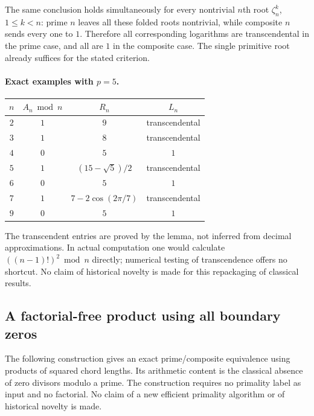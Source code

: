 \documentclass[11pt,a4paper]{article}
\theoremstyle{definition}
\theoremstyle{remark}
\numberwithin{equation}{section}
\begin{document}
The same conclusion holds simultaneously for every nontrivial $n$th
root $\zeta_n^k$, $1\le k<n$: prime $n$ leaves all these folded roots
nontrivial, while composite $n$ sends every one to $1$. Therefore all
corresponding logarithms are transcendental in the prime case, and all
are $1$ in the composite case. The single primitive root already
suffices for the stated criterion.

\paragraph{Exact examples with $p=5$.}
\begin{center}
\begin{tabular}{c c c c}
$n$ & $A_n\bmod n$ & $R_n$ & $L_n$\\\hline
$2$ & $1$ & $9$ & transcendental\\
$3$ & $1$ & $8$ & transcendental\\
$4$ & $0$ & $5$ & $1$\\
$5$ & $1$ & $(15-\sqrt5)/2$ & transcendental\\
$6$ & $0$ & $5$ & $1$\\
$7$ & $1$ & $7-2\cos(2\pi/7)$ & transcendental\\
$9$ & $0$ & $5$ & $1$
\end{tabular}
\end{center}
The transcendent entries are proved by the lemma, not inferred from
decimal approximations. In actual computation one would calculate
$((n-1)!)^2\bmod n$ directly; numerical testing of transcendence offers
no shortcut. No claim of historical novelty is made for this
repackaging of classical results.


\subsection{A factorial-free product using all boundary zeros}
\label{C:sec:chord-product-classifier}

The following construction gives an exact prime/composite equivalence
using products of squared chord lengths. Its arithmetic content is the
classical absence of zero divisors modulo a prime. The construction
requires no primality label as input and no factorial. No claim of a new
efficient primality algorithm or of historical novelty is made.
\end{document}
